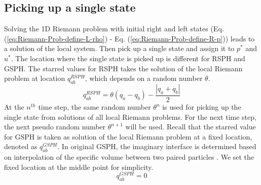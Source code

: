 \subsection{Picking up a single state} \label{sec:Picking-up-single-state}
Solving the 1D Riemann problem with initial right and left states (Eq. (\ref{eq:Riemann-Prob-define-L-rho}) - Eq. (\ref{eq:Riemann-Prob-define-R-p})) leads to a solution of the local system. Then pick up a single state and assign it to $p^{\ast}$ and $u^{\ast}$. The location where the single state is picked up is different for RSPH and GSPH. The starred values for RSPH takes the solution of the local Riemann problem at location $q_{ab}^{RSPH}$, which depends on a random number $\theta$. 
\begin{equation}
q_{ab}^{RSPH}=\theta \left( q_a - q_b \right) - \frac{| q_a + q_b|}{2}
\label{eq:sample-location-RSPH}
\end{equation}
At the $n^{th}$ time step, the same random number $\theta^n$ is used for picking up the single state from solutions of all local Riemann problems. For the next time step, the next pseudo random number $\theta^{n+1}$ will be used.
Recall that the starred value for GSPH is taken as solution of the local Riemann problem at a fixed location, denoted as $q_{ab}^{GSPH}$. In original GSPH, the imaginary interface is determined based on interpolation of the specific volume between two paired particles \citep{inutsuka2002reformulation}. We set the fixed location at the middle point \citep{cha2003implementations} for simplicity. 
\begin{equation}
q_{ab}^{GSPH}= 0
\label{eq:sample-location-GSPH}
\end{equation} 

